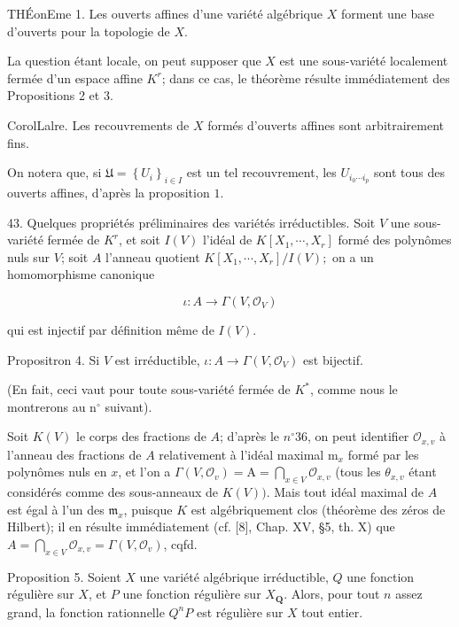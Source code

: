 THÉonEme 1. Les ouverts affines d'une variété algébrique $X$ forment une base d'ouverts pour la topologie de $X$.

La question étant locale, on peut supposer que $X$ est une sous-variété localement fermée d'un espace affine $K^{r}$; dans ce cas, le théorème résulte immédiatement des Propositions 2 et $3 .$

CorolLalre. Les recouvrements de $X$ formés d'ouverts affines sont arbitrairement fins.

On notera que, si $\mathfrak{U}=\left\{U_{i}\right\}_{i \in I}$ est un tel recouvrement, les $U_{i_{0} \cdots i_{p}}$ sont tous des ouverts affines, d'après la proposition $1 .$

43. Quelques propriétés préliminaires des variétés irréductibles. Soit $V$ une sous-variété fermée de $K^{r}$, et soit $I(V)$ l'idéal de $K\left[X_{1}, \cdots, X_{r}\right]$ formé des polynômes nuls sur $V$; soit $A$ l'anneau quotient $K\left[X_{1}, \cdots, X_{r}\right] / I(V) ;$ on a un homomorphisme canonique

$$
\iota: A \rightarrow \Gamma\left(V, \mathcal{O}_{V}\right)
$$

qui est injectif par définition même de $I(V)$.

Propositron 4. Si $V$ est irréductible, $\iota: A \rightarrow \Gamma\left(V, \mathcal{O}_{V}\right)$ est bijectif.

(En fait, ceci vaut pour toute sous-variété fermée de $K^{*}$, comme nous le montrerons au $\mathrm{n}^{\circ}$ suivant).

Soit $K(V)$ le corps des fractions de $A$; d'après le $n^{\circ} 36$, on peut identifier $\mathcal{O}_{x, v}$ à l'anneau des fractions de $A$ relativement à l'idéal maximal $\mathrm{m}_{x}$ formé par les polynômes nuls en $x$, et l'on a $\Gamma\left(V, \mathcal{O}_{v}\right)=\mathrm{A}=\bigcap_{x \in V} \mathcal{O}_{x, v}$ (tous les $\theta_{x, v}$ étant considérés comme des sous-anneaux de $K(V)) .$ Mais tout idéal maximal de $A$ est égal à l'un des $\mathfrak{m}_{x}$, puisque $K$ est algébriquement clos (théorème des zéros de Hilbert); il en résulte immédiatement (cf. [8], Chap. XV, §5, th. X) que $A=\bigcap_{x \in V} \mathcal{O}_{x, v}=\Gamma\left(V, \mathcal{O}_{v}\right)$, cqfd.

Proposition 5. Soient $X$ une variété algébrique irréductible, $Q$ une fonction régulière sur $X$, et $P$ une fonction régulière sur $X_{\mathbf{Q}} .$ Alors, pour tout $n$ assez grand, la fonction rationnelle $Q^{n} P$ est régulière sur $X$ tout entier.

